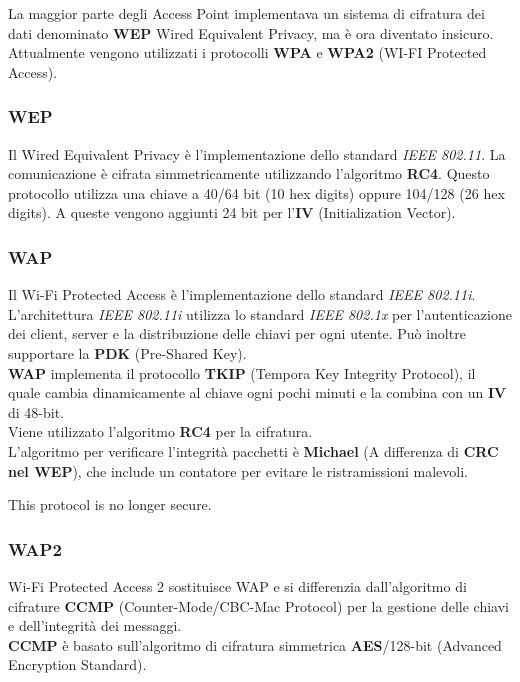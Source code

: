 \documentclass{article}
\begin{document}
La maggior parte degli Access Point implementava un sistema di cifratura dei dati denominato
\textbf{WEP} Wired Equivalent Privacy, ma è ora diventato insicuro.
Attualmente vengono utilizzati i protocolli \textbf{WPA} e \textbf{WPA2} (WI-FI Protected Access).

\subsubsection{WEP}

Il Wired Equivalent Privacy è l'implementazione dello standard \textit{IEEE 802.11}.
La comunicazione è cifrata simmetricamente utilizzando l'algoritmo \textbf{RC4}.
Questo protocollo utilizza una chiave a 40/64 bit (10 hex digits) oppure 104/128 (26 hex digits).
A queste vengono aggiunti 24 bit per l'\textbf{IV} (Initialization Vector). 

\subsubsection{WAP}

Il Wi-Fi Protected Access è l'implementazione dello standard \textit{IEEE 802.11i}.
L'architettura \textit{IEEE 802.11i} utilizza lo standard \textit{IEEE 802.1x} per l'autenticazione
dei client, server e la distribuzione delle chiavi per ogni utente.
Può inoltre supportare la \textbf{PDK} (Pre-Shared Key).
\\
\textbf{WAP} implementa il protocollo \textbf{TKIP} (Tempora Key Integrity Protocol), il quale
cambia dinamicamente al chiave ogni pochi minuti e la combina con un \textbf{IV} di 48-bit.
\\
Viene utilizzato l'algoritmo \textbf{RC4} per la cifratura.
\\
L'algoritmo per verificare l'integrità pacchetti è \textbf{Michael} (A differenza di \textbf{CRC nel WEP}),
che include un contatore per evitare le ristramissioni malevoli.

This protocol is no longer secure.

\subsubsection{WAP2}

Wi-Fi Protected Access 2 sostituisce WAP e si differenzia dall'algoritmo di cifrature \textbf{CCMP}
(Counter-Mode/CBC-Mac Protocol) per la gestione delle chiavi e dell'integrità dei messaggi.
\\
\textbf{CCMP} è basato sull'algoritmo di cifratura simmetrica \textbf{AES}/128-bit (Advanced Encryption Standard).
\end{document}
